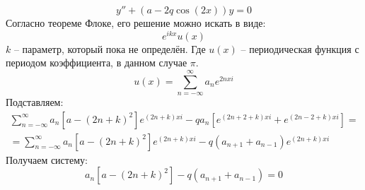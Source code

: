 \[
	y'' + (a - 2 q \cos (2x)) y = 0
\]
Согласно теореме Флоке, его решение можно искать в виде:
\[
	e^{ikx} u(x)
\]
$k$ -- параметр, который пока не определён.
Где $u(x)$ -- периодическая функция с периодом коэффициента, в данном случае $\pi$.
\[
	u(x) = \sum\limits_{n = -\infty}^\infty a_n e^{2nxi}
\]
Подставляем:
\[
	\begin{gathered}
	\sum\limits_{n = -\infty}^\infty a_n [a - (2n + k)^2 ] e^{(2n + k)xi} - 
	q a_n \left[e^{(2n + 2 + k)xi} + e^{(2n - 2 + k)xi}\right] =
	\\ =
	\sum\limits_{n = -\infty}^\infty a_n [a - (2n + k)^2 ] e^{(2n + k)xi} - 
	q (a_{n + 1} + a_{n - 1}) e^{(2n + k)xi}
	\end{gathered}
\]
Получаем систему:
\[
	a_n [a - (2n + k)^2 ] - q (a_{n + 1} + a_{n - 1})  = 0
\]
